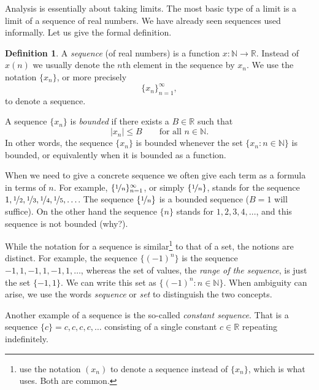 \documentclass[12pt]{book}
\newcommand{\abs}[1]{\left\lvert {#1} \right\rvert}
\newcommand{\R}{{\mathbb{R}}}
\newcommand{\N}{{\mathbb{N}}}
\newcommand{\myindex}[1]{#1\index{#1}}
\theoremstyle{plain}
\theoremstyle{remark}
\theoremstyle{definition}
\newtheorem{defn}[thm]{Definition}
\theoremstyle{exercise}
\theoremstyle{example}
\begin{document}
Analysis is essentially about taking limits.  The most basic type of a limit
is a limit of a sequence of real numbers.
We have already seen sequences used informally.  Let us give the formal
definition.

\begin{defn}
A \emph{\myindex{sequence}} (of real numbers) is a function $x \colon \N \to \R$.  Instead of $x(n)$ we 
usually denote the $n$th element in the sequence by $x_n$.  We 
use the notation $\{ x_n \}$, or more precisely
\begin{equation*}
\{ x_n \}_{n=1}^\infty,
\end{equation*}
to denote a sequence.

A sequence $\{ x_n \}$ is \emph{bounded} if
there exists a $B \in \R$ such that
\begin{equation*}
\abs{x_n} \leq B \qquad \text{for all $n \in \N$.}
\end{equation*}
In other words, the sequence $\{x_n\}$ is bounded whenever
the set $\{ x_n : n \in \N \}$
is bounded, or equivalently when it is bounded as a function.
\end{defn}

When we need
to give a concrete sequence we often give each term as a formula in
terms of $n$.
For example, $\{ \nicefrac{1}{n} \}_{n=1}^\infty$, or simply $\{
\nicefrac{1}{n} \}$, stands for
the sequence $1, \nicefrac{1}{2}, \nicefrac{1}{3}, \nicefrac{1}{4},
\nicefrac{1}{5}, \ldots$.
The sequence $\{ \nicefrac{1}{n} \}$
is a bounded sequence ($B=1$ will
suffice).  On the other hand the sequence $\{ n \}$ stands for
$1,2,3,4,\ldots$, and this sequence is not bounded (why?).

While the notation for a sequence
is similar\footnote{\cite{BS} use the notation $(x_n)$ to denote
a sequence instead of $\{ x_n \}$, which is what \cite{Rudin:baby} uses.
Both are common.}
to that of a set, the notions are
distinct.  For example, the sequence $\{ {(-1)}^n \}$ is the sequence
$-1,1,-1,1,-1,1,\ldots$, whereas the set of values, the
\emph{range of the sequence},
is just the set $\{ -1, 1 \}$.  We can write this set
as $\{ {(-1)}^n : n \in \N \}$.   When ambiguity can arise, we
use the words \emph{sequence} or \emph{set} to distinguish the two
concepts.

Another example of a sequence is the so-called \emph{\myindex{constant sequence}}.
That is a sequence $\{ c \} = c,c,c,c,\ldots$ consisting of a single
constant $c \in \R$ repeating indefinitely.
\end{document}
